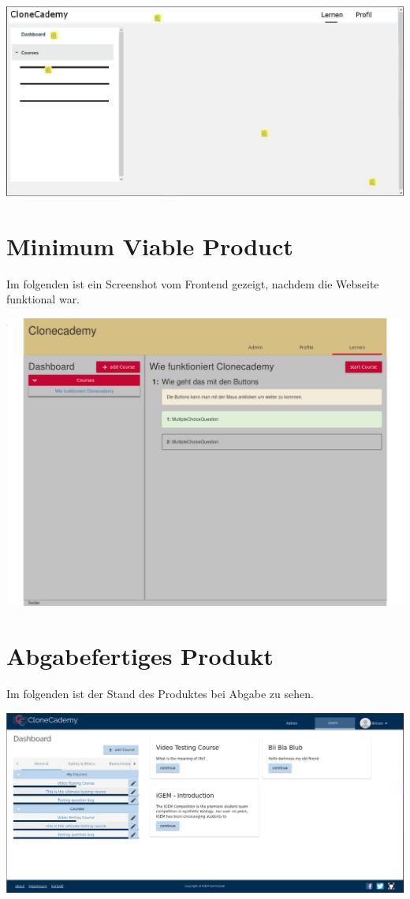 \documentclass[accentcolor=tud0b,12pt,paper=a4]{tudreport}
\begin{document}
	\includegraphics[height=0.3\textheight]{appendix/bilder/design_example_2-0.jpg}


	\section*{Minimum Viable Product}
	Im folgenden ist ein Screenshot vom Frontend gezeigt, nachdem die Webseite funktional war.

	\includegraphics[width=\textwidth]{appendix/screenshots/forntend.png}

	\section*{Abgabefertiges Produkt}
	Im folgenden ist der Stand des Produktes bei Abgabe zu sehen.

	\includegraphics[height=0.3\textheight]{appendix/screenshots/dashboard.jpg}
\end{document}
